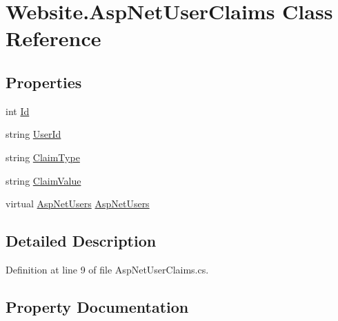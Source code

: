 \hypertarget{class_website_1_1_asp_net_user_claims}{}\section{Website.\+Asp\+Net\+User\+Claims Class Reference}
\label{class_website_1_1_asp_net_user_claims}
\subsection*{Properties}
\begin{DoxyCompactItemize}
\item 
int \hyperlink{class_website_1_1_asp_net_user_claims_a987bf13aa51a358fa466df3a75b25201}{Id}
\item 
string \hyperlink{class_website_1_1_asp_net_user_claims_a5c2c964aaa213a8bd3ebda162eb021cb}{User\+Id}
\item 
string \hyperlink{class_website_1_1_asp_net_user_claims_a51a3cbc00317136901b60aa49d3384d6}{Claim\+Type}
\item 
string \hyperlink{class_website_1_1_asp_net_user_claims_ad52314b997f96e61f5afc14a580dd39a}{Claim\+Value}
\item 
virtual \hyperlink{class_website_1_1_asp_net_users}{Asp\+Net\+Users} \hyperlink{class_website_1_1_asp_net_user_claims_a419dcbf398f01c760a824ec67610159d}{Asp\+Net\+Users}
\end{DoxyCompactItemize}


\subsection{Detailed Description}


Definition at line 9 of file Asp\+Net\+User\+Claims.\+cs.



\subsection{Property Documentation}
\hypertarget{class_website_1_1_asp_net_user_claims_a419dcbf398f01c760a824ec67610159d}{}
